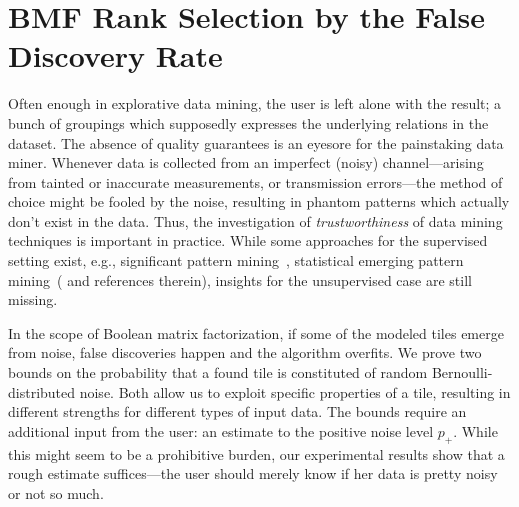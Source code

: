 \chapter{BMF Rank Selection by the False Discovery Rate}
\label{chap:RankFDR}

Often enough in explorative data mining, the user is left alone with the result; a bunch of groupings which supposedly expresses the underlying relations in the dataset. The absence of quality guarantees is an eyesore for the painstaking data miner.
Whenever data is collected from an imperfect (noisy) channel---arising from tainted or inaccurate measurements, or transmission errors---the method of choice might be fooled by the noise, resulting in phantom patterns which actually don't exist in the data. Thus, the investigation of \emph{trustworthiness} of data mining techniques is important in practice. While some approaches for the supervised setting exist, e.g., significant pattern mining~\citep{llinares2015fast}, statistical emerging pattern mining~(\cite{komiyama2017statistical} and references therein), insights for the unsupervised case are still missing. 

In the scope of Boolean matrix factorization, if some of the modeled tiles emerge from noise, false discoveries happen and the algorithm overfits.
We prove two bounds on the probability that a found tile is constituted of random Bernoulli-distributed noise. Both allow us to exploit specific properties of a tile, resulting in different strengths for different types of input data.
The bounds require an additional input from the user: an estimate to the positive noise level $p_+$. While this might seem to be a prohibitive burden, our experimental results show that a rough estimate suffices---the user should merely know if her data is pretty noisy or not so much.

